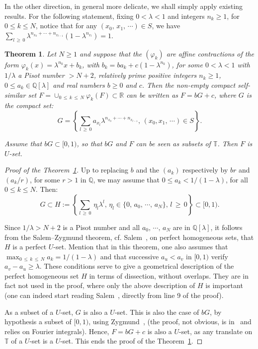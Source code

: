 \documentclass[10pt]{amsart}
\newtheorem{theo}{Theorem}[section]
\theoremstyle{definition}\newtheorem{defi}[theo]{Definition}\newtheorem{rema}[theo]{Remark}\newtheorem{exam}[theo]{Example}\newtheorem{exem}[theo]{Example}\newtheorem{nota}[theo]{Notation}
\newcommand{\Tbb}{\mathbb T}
\newcommand{\Rbb}{\mathbb R}
\newcommand{\Qbb}{\mathbb Q}
\begin{document}
In the other direction, in general more delicate, we shall simply apply existing results. For the following statement, fixing $0<\lambda<1$ and integers $n_k\geq 1$, for $0\leq k\leq N$, notice that for any $(x_0,\,x_1,\,\cdots)\in S$, we have $\sum_{l\,\geq\,0}\lambda^{n_{x_0}+\cdots+n_{x_{l-1}}}(1-\lambda^{n_{x_l}})=1$.


\begin{theo}\label{uniq}
Let $N\geq1$ and suppose that the $(\varphi_k)$ are affine contractions of the form $\varphi_k(x)=\lambda^{n_k}x+b_k$, with $b_k=ba_k+c(1-\lambda^{n_k})$, for some $0<\lambda<1$ with $1/\lambda$ a Pisot number $>N+2$, relatively prime positive integers $n_k\geq1$, $0\leq a_k\in\Qbb[\lambda]$ and real numbers $b\geq0$ and $c$. Then the non-empty compact self-similar set $F=\cup_{0\,\leq\,k\,\leq\,N}\varphi_k(F)\subset\Rbb$ can be written as $F=bG+c$, where $G$ is the compact set:
\[
G=\left\{{\sum_{l\,\geq\,0}a_{x_l}\lambda^{n_{x_0}+\cdots+n_{x_{l-1}}},\,(x_0,x_1,\,\cdots)\in S}\right\}.
\]

Assume that $bG\subset[0,1)$, so that $bG$ and $F$ can be seen as subsets of $\Tbb$. Then $F$ is $U$-set.
\end{theo}


\begin{proof}[{Proof of the Theorem~\ref{uniq}}]
Up to replacing $b$ and the $(a_k)$ respectively by $br$ and $(a_k/r)$, for some $r>1$ in $\Qbb$, we may assume that $0\leq a_k<1/(1-\lambda)$, for all $0\leq k\leq N$. Then:
\[
G\subset H:=\left\{{\sum_{l\,\geq\,0}\,\eta_l\lambda^l,\,\eta_l\in\{0,\,a_0,\,\cdots,\,a_N\},\,l\,\geq\,0}\right\}\subset[0,1).
\]

Since $1/\lambda>N+2$ is a Pisot number and all $a_0,\,\cdots,\,a_N$ are in $\Qbb[\lambda]$, it follows from the Salem--Zygmund theorem, cf. Salem~\cite[Chapter~VII, Paragraph~3]{salem2}, on perfect homogeneous sets, that $H$ is a perfect $U$-set. Mention that in this theorem, one also assumes that $\max_{0\,\leq\,k\,\leq\,N}a_k=1/(1-\lambda)$ and that successive $a_u<a_v$ in $[0,1)$ verify $a_v-a_u\geq \lambda$. These conditions serve to give a geometrical description of the perfect homogeneous set $H$ in terms of dissection, without overlaps. They are in fact not used in the proof, where only the above description of $H$ is important (one can indeed start reading Salem~\cite[Chapter~VII, Paragraph~3]{salem2}, directly from line 9 of the proof).

As a subset of a $U$-set, $G$ is also a $U$-set. This is also the case of $bG$, by hypothesis a subset of $[0,1)$, using Zygmund~\cite[Vol. I, Chapter~IX, Theorem~6.18]{zyg}, (the proof, not obvious, is in~\cite[Vol. II, Chapter~XVI, 10.25]{zyg} and relies on Fourier integrals). Hence, $F=bG+c$ is also a $U$-set, as any translate on $\Tbb$ of a $U$-set is a $U$-set. This ends the proof of the Theorem~\ref{uniq}.
\end{proof}
\end{document}
